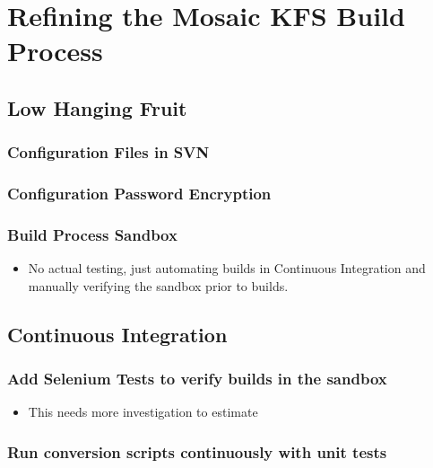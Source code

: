 \section{Refining the Mosaic KFS Build Process}
\label{sec-1}

\subsection{Low Hanging Fruit}
\label{sec-1.1}

\subsubsection{Configuration Files in SVN}
\label{sec-1.1.1}

\subsubsection{Configuration Password Encryption}
\label{sec-1.1.2}

\subsubsection{Build Process Sandbox}
\label{sec-1.1.3}

\begin{itemize}
\item No actual testing, just automating builds in Continuous Integration and manually 
      verifying the sandbox prior to builds.
\end{itemize}

\subsection{Continuous Integration}
\label{sec-1.2}

\subsubsection{Add Selenium Tests to verify builds in the sandbox}
\label{sec-1.2.1}

\begin{itemize}
\item This needs more investigation to estimate
\end{itemize}

\subsubsection{Run conversion scripts continuously with unit tests}
\label{sec-1.2.2}

